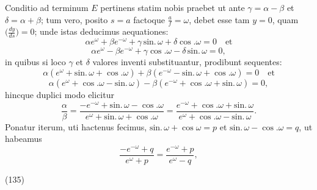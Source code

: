 \documentclass[11pt,a4paper]{article}
\begin{document}
Conditio ad terminum $E$ pertinens statim nobis praebet ut ante
$\gamma = \alpha - \beta$ et $\delta = \alpha + \beta$; tum vero, posito $s = a$
factoque $\frac{a}{f} = \omega$, debet esse tam $y = 0$, quam
$\bigl(\frac{dy}{ds}\bigr) = 0$; unde istas deducimus aequationes:
\[
\alpha e^\omega + \beta e^{-\omega} + \gamma\,\text{sin.}\,\omega + \delta\cos.\omega = 0 \quad\text{et}
\]
\[
\alpha e^\omega - \beta e^{-\omega} + \gamma\cos.\omega - \delta\,\text{sin.}\,\omega = 0,
\]
in quibus si loco $\gamma$ et $\delta$ valores inventi substituantur, prodibunt
sequentes:
\[
\alpha(e^\omega + \text{sin.}\,\omega + \cos.\omega) + \beta(e^{-\omega} - \text{sin.}\,\omega + \cos.\omega) = 0 \quad\text{et}
\]
\[
\alpha(e^\omega + \cos.\omega - \text{sin.}\,\omega) - \beta(e^{-\omega} + \cos.\omega + \text{sin.}\,\omega) = 0,
\]
hincque duplici modo elicitur
\[
\frac{\alpha}{\beta} = \frac{-e^{-\omega} + \text{sin.}\,\omega - \cos.\omega}{e^\omega + \text{sin.}\,\omega + \cos.\omega} = \frac{e^{-\omega} + \cos.\omega + \text{sin.}\,\omega}{e^\omega + \cos.\omega - \text{sin.}\,\omega}.
\]
Ponatur iterum, uti hactenus fecimus, $\text{sin.}\,\omega + \cos\omega = p$ et
$\text{sin.}\,\omega - \cos.\omega = q$, ut habeamus
\[
\frac{-e^{-\omega} + q}{e^\omega + p} = \frac{e^{-\omega} + p}{e^\omega - q},
\]

(135)
\end{document}
